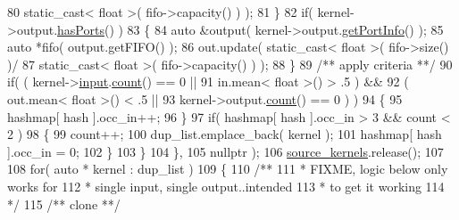 \begin{DoxyCode}
80                                                 static\_cast< float >( fifo->capacity() ) );
81                               \}
82                               \textcolor{keywordflow}{if}( kernel->output.\hyperlink{class_port_a7042f5b5c2ab14c9591a4984811a6012}{hasPorts}() )
83                               \{
84                                  \textcolor{keyword}{auto} &output( kernel->output.\hyperlink{class_port_a4af1cb062940ca3b83c569f024b9a8d1}{getPortInfo}() );
85                                  \textcolor{keyword}{auto} *fifo( output.getFIFO() );
86                                  out.update( static\_cast< float >( fifo->size() )/ 
87                                                   static\_cast< float >( fifo->capacity() ) );
88                               \}\textcolor{comment}{}
89 \textcolor{comment}{                              /** apply criteria **/}
90                               \textcolor{keywordflow}{if}( ( kernel->\hyperlink{classraft_1_1kernel_a6edbe35a56409d402e719b3ac36d6554}{input}.\hyperlink{class_port_a33562ea87ac7e83a32441da40cbd9279}{count}() == 0 ||
91                                     in.mean< \textcolor{keywordtype}{float} >() > .5  ) &&
92                                   ( out.mean< \textcolor{keywordtype}{float} >() < .5   ||
93                                     kernel->output.\hyperlink{class_port_a33562ea87ac7e83a32441da40cbd9279}{count}() == 0 ) )
94                               \{
95                                  hashmap[ hash ].occ\_in++;
96                               \}
97                               \textcolor{keywordflow}{if}( hashmap[ hash ].occ\_in > 3 && count < 2 )
98                               \{
99                                  count++;
100                                  dup\_list.emplace\_back( kernel );
101                                  hashmap[ hash ].occ\_in = 0;
102                               \}
103                            \}
104                         \},
105                         nullptr );
106       \hyperlink{classbasic__parallel_a969b8832b2f6eaea5e985d4582d9e4dc}{source\_kernels}.release();
107 
108       \textcolor{keywordflow}{for}( \textcolor{keyword}{auto} * kernel : dup\_list )
109       \{\textcolor{comment}{}
110 \textcolor{comment}{         /**}
111 \textcolor{comment}{          * FIXME, logic below only works for}
112 \textcolor{comment}{          * single input, single output..intended}
113 \textcolor{comment}{          * to get it working}
114 \textcolor{comment}{          */}\textcolor{comment}{}
115 \textcolor{comment}{         /** clone **/}

\end{DoxyCode}
